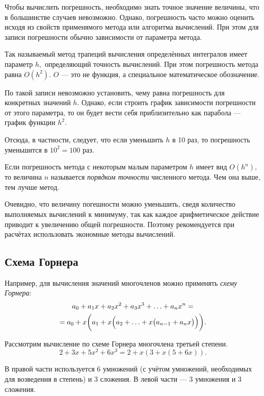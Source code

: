 Чтобы вычислить погрешность, необходимо знать точное значение величины,
что в большинстве случаев невозможно. Однако, погрешность часто можно
оценить исходя из свойств применямого метода или алгоритма вычислений.
При этом для записи погрешности обычно зависимости от параметра метода.
\begin{example}
Так называемый метод трапеций вычисления определённых интегралов имеет
параметр $h,$ определяющий точность вычислений. При этом погрешность
метода равна $O(h^{2}).$ $O$ — это не функция, а специальное математическое
обозначение.

По такой записи невозможно установить, чему равна погрешность для
конкретных значений $h.$ Однако, если строить график зависимости
погрешности от этого параметра, то он будет вести себя приблизительно
как парабола — график функции $h^{2}.$

Отсюда, в частности, следует, что если уменьшить $h$ в 10 раз, то
погрешность уменьшится в $10^{2}=100$ раз.
\end{example}
\smallskip{}


Если погрешность метода с некоторым малым параметром $h$ имеет вид
$O(h^{n}),$ то величина $n$ называется \emph{порядком точности}
численного метода. Чем она выше, тем лучше метод.

Очевидно, что величину погешности можно уменьшить, сведя количество
выполняемых вычислений к минимуму, так как каждое арифметическое действие
приводит к увеличению общей погрешности. Поэтому рекомендуется при
расчётах использовать экономные методы вычислений.


\subsection{Схема Горнера}

Например, для вычисления значений многочленов можно применять \emph{схему
Горнера}:
\begin{multline*}
a_{0}+a_{1}x+a_{2}x^{2}+a_{3}x^{3}+\ldots+a_{n}x^{n}=\\
=a_{0}+x\biggl(a_{1}+x\Bigl(a_{2}+\ldots+x\bigl(a_{n-1}+a_{n}x\bigr)\Bigr)\biggr).
\end{multline*}

\begin{example}
Рассмотрим вычисление по схеме Горнера многочлена третьей степени.
\[
2+3x+5x^{2}+6x^{3}=2+x(3+x(5+6x)).
\]


В правой части используется 6 умножений (с учётом умножений, необходимых
для возведения в степень) и 3 сложения. В левой части — 3 умножения
и 3 сложения.
\end{example}
\smallskip{}


